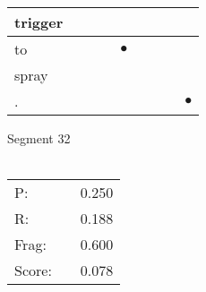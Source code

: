 \documentclass[landscape]{article}
\newcommand{\ssp}{\hspace{2pt}}
\newcommand{\mex}{\cellcolor{g}$\bullet$}
\begin{document}
\begin{tabular}{|l|p{10pt}|p{10pt}|p{10pt}|p{10pt}|p{10pt}|p{10pt}|p{10pt}|p{10pt}|}
\hline
\ssp trigger \ssp&\hspace{2pt}&\hspace{2pt}&\hspace{2pt}&\hspace{2pt}&\hspace{2pt}&\hspace{2pt}&\hspace{2pt}&\hspace{2pt}\\
\hline
\ssp \cellcolor{ref3}to \ssp&\hspace{2pt}&\hspace{2pt}&\hspace{2pt}&\hspace{2pt}\mex&\hspace{2pt}&\hspace{2pt}&\hspace{2pt}&\hspace{2pt}\\
\hline
\ssp spray \ssp&\hspace{2pt}&\hspace{2pt}&\hspace{2pt}&\hspace{2pt}&\hspace{2pt}&\hspace{2pt}&\hspace{2pt}&\hspace{2pt}\\
\hline
\ssp \cellcolor{ref7}. \ssp&\hspace{2pt}&\hspace{2pt}&\hspace{2pt}&\hspace{2pt}&\hspace{2pt}&\hspace{2pt}&\hspace{2pt}&\hspace{2pt}\mex\\
\hline
\end{tabular}

\vspace{6pt}
\noindent Segment 32\\\\
\noindent\begin{tabular}{lm{12pt}r}
\hline
P:&&0.250\\
R:&&0.188\\
Frag:&&0.600\\
Score:&&0.078\\
\end{tabular}
\end{document}
